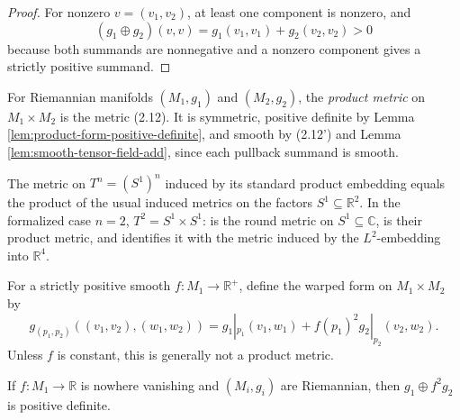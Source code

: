 \begin{proof}

\sketch For nonzero $v=(v_1,v_2)$, at least one component is nonzero, and
\[
(g_1\oplus g_2)(v,v)=g_1(v_1,v_1)+g_2(v_2,v_2)>0
\]
because both summands are nonnegative and a nonzero component gives a strictly positive summand.
\end{proof}

\begin{definition}
\label{def:product-metric}





For Riemannian manifolds $(M_1,g_1)$ and $(M_2,g_2)$, the \emph{product metric} on $M_1\times M_2$ is the metric (2.12). It is symmetric, positive definite by Lemma \ref{lem:product-form-positive-definite}, and smooth by (2.12') and Lemma \ref{lem:smooth-tensor-field-add}, since each pullback summand is smooth.
\end{definition}

\begin{proposition}
\label{prop:product-metric-torus}


The metric on $T^n=(S^1)^n$ induced by its standard product embedding equals
the product of the usual induced metrics on the factors
$S^1\subseteq\mathbb R^2$. In the formalized case $n=2$,
$T^2=S^1\times S^1$:  is the round metric on
$S^1\subseteq\mathbb C$,  is their product
metric, and  identifies it
with the metric induced by the $L^2$-embedding into $\mathbb R^4$.
\end{proposition}

For a strictly positive smooth $f:M_1\to\mathbb R^+$, define the warped form on $M_1\times M_2$ by
\begin{equation}
g_{(p_1,p_2)}((v_1,v_2),(w_1,w_2))=g_1|_{p_1}(v_1,w_1)+f(p_1)^2g_2|_{p_2}(v_2,w_2).
\end{equation}
Unless $f$ is constant, this is generally not a product metric.

\begin{lemma}
\label{lem:warped-product-form-positive-definite}





If $f:M_1\to\mathbb R$ is nowhere vanishing and $(M_i,g_i)$ are Riemannian, then $g_1\oplus f^2g_2$ is positive definite.
\end{lemma}

